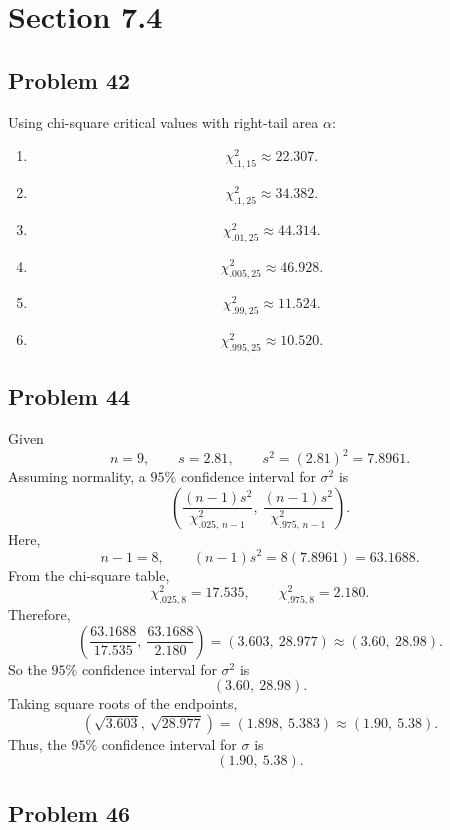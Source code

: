 \documentclass[11pt]{article}
\begin{document}
\section*{Section 7.4}

\subsection*{Problem 42}

Using chi-square critical values with right-tail area $\alpha$:
\begin{enumerate}
\item[(a)]
\[
\chi^2_{.1,15}\approx 22.307.
\]

\item[(b)]
\[
\chi^2_{.1,25}\approx 34.382.
\]

\item[(c)]
\[
\chi^2_{.01,25}\approx 44.314.
\]

\item[(d)]
\[
\chi^2_{.005,25}\approx 46.928.
\]

\item[(e)]
\[
\chi^2_{.99,25}\approx 11.524.
\]

\item[(f)]
\[
\chi^2_{.995,25}\approx 10.520.
\]
\end{enumerate}

\subsection*{Problem 44}

Given
\[
n=9, \qquad s=2.81, \qquad s^2=(2.81)^2=7.8961.
\]
Assuming normality, a $95\%$ confidence interval for $\sigma^2$ is
\[
\left(\frac{(n-1)s^2}{\chi^2_{.025,\,n-1}},\ \frac{(n-1)s^2}{\chi^2_{.975,\,n-1}}\right).
\]
Here,
\[
n-1=8, \qquad (n-1)s^2=8(7.8961)=63.1688.
\]
From the chi-square table,
\[
\chi^2_{.025,8}=17.535, \qquad \chi^2_{.975,8}=2.180.
\]
Therefore,
\[
\left(\frac{63.1688}{17.535},\ \frac{63.1688}{2.180}\right)=(3.603,\ 28.977)\approx(3.60,\ 28.98).
\]
So the $95\%$ confidence interval for $\sigma^2$ is
\[
(3.60,\ 28.98).
\]
Taking square roots of the endpoints,
\[
\left(\sqrt{3.603},\ \sqrt{28.977}\right)=(1.898,\ 5.383)\approx(1.90,\ 5.38).
\]
Thus, the $95\%$ confidence interval for $\sigma$ is
\[
(1.90,\ 5.38).
\]

\subsection*{Problem 46}
\end{document}
